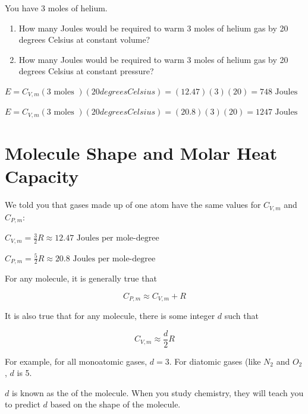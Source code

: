 \begin{Exercise}[title={Warming Helium}, label=warming_helium]

You have 3 moles of helium. 
 
\begin{enumerate}

\item How many Joules would be required to warm 3 moles of helium gas by 20 degrees Celsius at constant volume? 

\item How many Joules would be required to warm 3 moles of helium gas by 20 degrees Celsius at constant pressure? 

\end{enumerate}


\end{Exercise}
\begin{Answer}[ref=warming_helium]

$E = C_{V,m} (3 \text{ moles }) (20 { degrees Celsius }) = (12.47)(3)(20) = 748 \text{ Joules }$

$E = C_{V,m} (3 \text{ moles }) (20 { degrees Celsius }) = (20.8)(3)(20) = 1247 \text{ Joules }$
\end{Answer}

\section{Molecule Shape and Molar Heat Capacity}

We told you that gases made up of one atom have the same values for $C_{V,m}$ and $C_{P,m}$:

$C_{V,m} = \frac{3}{2}R \approx 12.47 \text{ Joules per mole-degree}$

$C_{P,m} = \frac{5}{2}R \approx 20.8 \text{ Joules per mole-degree}$

For any molecule, it is generally true that 

$$C_{P,m} \approx C_{V,m} + R$$

It is also true that for any molecule, there is some integer $d$ such that

$$C_{V, m} \approx \frac{d}{2}R$$

For example, for all monoatomic gases, $d = 3$. For diatomic gases (like $N_2$ and $O_2$, $d$ is 5.

$d$ is known as the  of the molecule. When you study chemistry, they will teach you to predict $d$ based on the shape of the molecule. 

